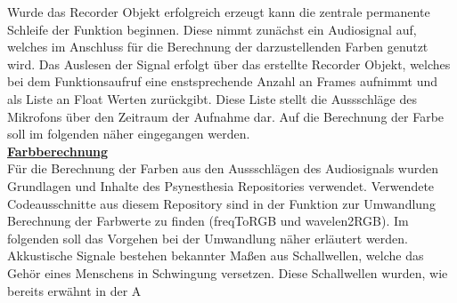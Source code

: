 Wurde das Recorder Objekt erfolgreich erzeugt kann die zentrale permanente Schleife der Funktion beginnen. Diese nimmt zunächst ein Audiosignal auf, 
welches im Anschluss für die Berechnung der darzustellenden Farben genutzt wird. Das Auslesen der Signal erfolgt über das erstellte Recorder Objekt,
welches bei dem Funktionsaufruf eine enstsprechende Anzahl an Frames aufnimmt und als Liste an Float Werten zurückgibt. Diese Liste stellt die Aussschläge 
des Mikrofons über den Zeitraum der Aufnahme dar. Auf die Berechnung der Farbe soll im folgenden näher eingegangen werden.\\

\textbf{\underline{Farbberechnung}}\\
Für die Berechnung der Farben aus den Aussschlägen des Audiosignals wurden Grundlagen und Inhalte des Psynesthesia Repositories verwendet. Verwendete Codeausschnitte aus 
diesem Repository sind in der Funktion zur Umwandlung Berechnung der Farbwerte zu finden (freqToRGB und wavelen2RGB). Im folgenden soll das Vorgehen bei der Umwandlung näher erläutert
werden. \\
Akkustische Signale bestehen bekannter Maßen aus Schallwellen, welche das Gehör eines Menschens in Schwingung versetzen. Diese Schallwellen wurden, wie bereits erwähnt in der A





